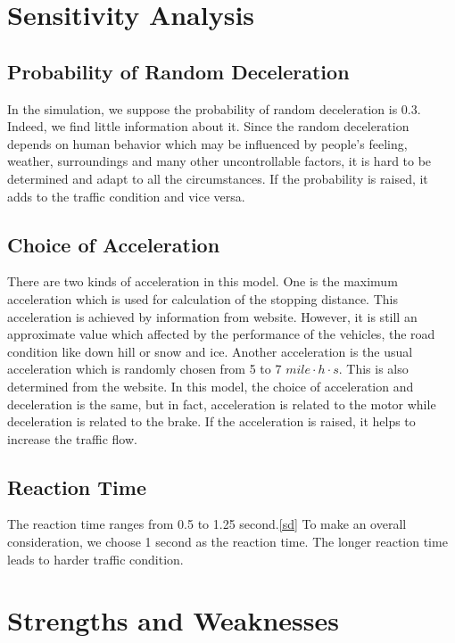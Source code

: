\documentclass[a4paper]{article}
\begin{document}
	\section{Sensitivity Analysis}
	\subsection{Probability of Random Deceleration}
	In the simulation, we suppose the probability of random deceleration is 0.3. Indeed, we find little information about it. Since the random deceleration depends on human behavior which may be influenced by people's feeling, weather, surroundings and many other uncontrollable factors, it is hard to be determined and adapt to all the circumstances. If the probability is raised, it adds to the traffic condition and vice versa.
	\subsection{Choice of Acceleration}
	There are two kinds of acceleration in this model. One is the maximum acceleration which is used for calculation of the stopping distance. This acceleration is achieved by information from website\cite{stopping}. However, it is still an approximate value which affected by the performance of the vehicles, the road condition like down hill or snow and ice. Another acceleration is the usual acceleration which is randomly chosen from 5 to 7 $ mile\cdot h\cdot s $. This is also determined from the website\cite{acc}. In this model, the choice of acceleration and deceleration is the same, but in fact, acceleration is related to the motor while deceleration is related to the brake. If the acceleration is raised, it helps to increase the traffic flow.
	\subsection{Reaction Time}
	The reaction time ranges from 0.5 to 1.25 second.\ref{sd} To make an overall consideration, we choose 1 second as the reaction time. The longer reaction time leads to harder traffic condition.
	\section{Strengths and Weaknesses}
\end{document}
